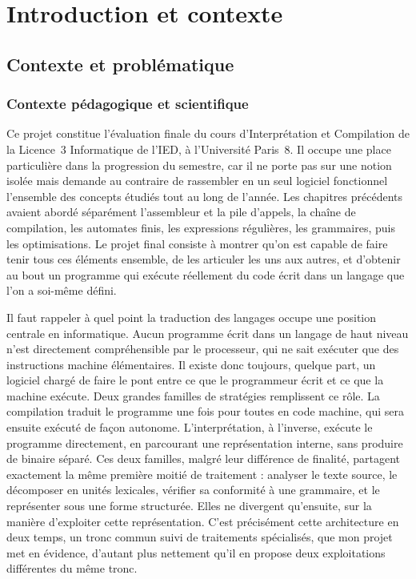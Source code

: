 \chapter{Introduction et contexte}
\label{chap:intro}

\section{Contexte et problématique}

\subsection{Contexte pédagogique et scientifique}

Ce projet constitue l'évaluation finale du cours d'Interprétation et Compilation
de la Licence~3 Informatique de l'IED, à l'Université Paris~8. Il occupe une
place particulière dans la progression du semestre, car il ne porte pas sur une
notion isolée mais demande au contraire de rassembler en un seul logiciel
fonctionnel l'ensemble des concepts étudiés tout au long de l'année. Les chapitres
précédents avaient abordé séparément l'assembleur et la pile d'appels, la chaîne
de compilation, les automates finis, les expressions régulières, les grammaires,
puis les optimisations. Le projet final consiste à montrer qu'on est capable de
faire tenir tous ces éléments ensemble, de les articuler les uns aux autres, et
d'obtenir au bout un programme qui exécute réellement du code écrit dans un langage
que l'on a soi-même défini.

Il faut rappeler à quel point la traduction des langages occupe une position
centrale en informatique. Aucun programme écrit dans un langage de haut niveau
n'est directement compréhensible par le processeur, qui ne sait exécuter que des
instructions machine élémentaires. Il existe donc toujours, quelque part, un
logiciel chargé de faire le pont entre ce que le programmeur écrit et ce que la
machine exécute. Deux grandes familles de stratégies remplissent ce rôle. La
compilation traduit le programme une fois pour toutes en code machine, qui sera
ensuite exécuté de façon autonome. L'interprétation, à l'inverse, exécute le
programme directement, en parcourant une représentation interne, sans produire de
binaire séparé. Ces deux familles, malgré leur différence de finalité, partagent
exactement la même première moitié de traitement : analyser le texte source, le
décomposer en unités lexicales, vérifier sa conformité à une grammaire, et le
représenter sous une forme structurée. Elles ne divergent qu'ensuite, sur la
manière d'exploiter cette représentation. C'est précisément cette architecture en
deux temps, un tronc commun suivi de traitements spécialisés, que mon projet met
en évidence, d'autant plus nettement qu'il en propose deux exploitations
différentes du même tronc.

